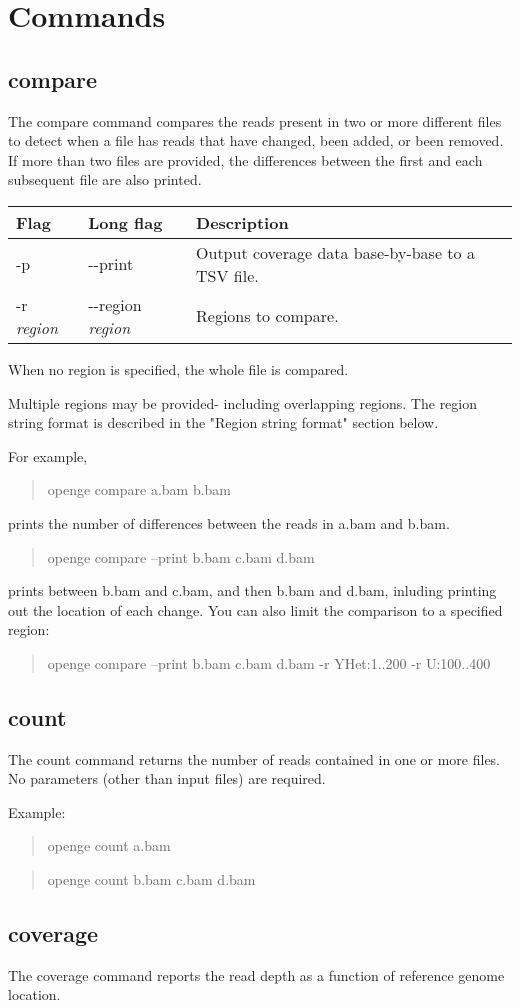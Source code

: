 \documentclass[11pt]{article}
\newcommand {\cmd}[1] {\begin{quote}#1\end{quote}}
\begin{document}
\section {Commands}

\subsection {compare}
The compare command compares the reads present in two or more different files to detect when a file has reads that have changed, been added, or been removed. If more than two files are provided, the differences between the first and each subsequent file are also printed.

\begin{center}
\begin{tabular}{llp{3.5in}}
\hline
Flag&Long flag&Description\\ \hline
-p&{-}{-}print&Output coverage data base-by-base to a TSV file.\\
-r  \textit{region}&{-}{-}region \textit{region}&Regions to compare.\\
\end{tabular}
\end{center}

When no region is specified, the whole file is compared.

Multiple regions may be provided- including overlapping regions. The region string format is described in the "Region string format" section below.

For example,
\cmd{openge compare a.bam b.bam}
prints the number of differences between the reads in a.bam and b.bam.
\cmd{openge compare --print b.bam c.bam d.bam}
prints between b.bam and c.bam, and then b.bam and d.bam, inluding printing out the location of each change. You can also limit the comparison to a specified region:
\cmd{openge compare --print b.bam c.bam d.bam -r YHet:1..200 -r U:100..400}

\subsection {count}
The count command returns the number of reads contained in one or more files. No parameters (other than input files) are required.

Example:
\cmd{openge count a.bam}
\cmd{openge count b.bam c.bam d.bam}

\subsection {coverage}
The coverage command reports the read depth as a function of reference genome location. 
\end{document}
